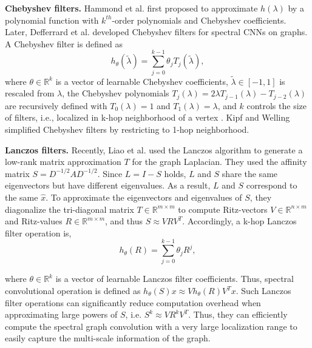 \documentclass{article}
\begin{document}
\smallskip
\textbf{Chebyshev filters.   } Hammond et al. \cite{hammond2011wavelets} first proposed to approximate $h (\lambda)$ by  a polynomial function with $k^{th}$-order polynomials and Chebyshev coefficients. Later, Defferrard et al. \cite{defferrard2016convolutional} developed Chebyshev filters for spectral CNNs on graphs. A Chebyshev filter is defined as
\begin{equation}
h_\theta (\tilde{\lambda})=\sum_{j=0}^{k-1} \theta_j T_j(\tilde{\lambda}),
\end{equation}
where $\theta\in\mathbb{R}^{k}$ is a vector of learnable Chebyshev coefficients, $\tilde{\lambda}\in [-1,1]$ is rescaled from $\lambda$, the Chebyshev polynomials $T_j(\lambda)=2\lambda T_{j-1}(\lambda)-T_{j-2}(\lambda)$ are recursively defined with $T_0(\lambda)=1$ and $T_1(\lambda)=\lambda$, and $k$ controls the size of filters, i.e., localized in k-hop neighborhood of a vertex \cite{hammond2011wavelets}. Kipf and Welling \cite{kipf2016semi} simplified Chebyshev filters by restricting to 1-hop neighborhood.




\smallskip
\textbf{Lanczos filters. } Recently, Liao et al. \cite{liao2019lanczosnet} used the Lanczos algorithm to generate a low-rank matrix approximation $T$ for the graph Laplacian. They used the affinity matrix $S=D^{-1/2}AD^{-1/2}$. Since $L=I-S$ holds, $L$ and $S$ share the same eigenvectors but have different eigenvalues. As a result, $L$ and $S$ correspond to the same $\hat{x}$. To approximate the eigenvectors and eigenvalues of $S$, they diagonalize the tri-diagonal matrix $T \in \mathbb{R}^{m\times m}$ to compute Ritz-vectors $V \in \mathbb{R}^{n\times m}$ and Ritz-values $R \in \mathbb{R}^{m\times m}$, and thus $S \approx VRV^T$. Accordingly, a k-hop Lanczos filter operation is,
\begin{equation}
h_{\theta}(R) = \sum_{j=0}^{k-1}\theta_jR^j,
\end{equation}

where $\theta \in \mathbb{R}^{k}$ is a vector of learnable Lanczos filter coefficients. Thus, spectral convolutional operation is defined as $h_{\theta}(S)x \approx Vh_{\theta}(R)V^Tx$. Such Lanczos filter operations can significantly reduce computation overhead when approximating large powers of $S$, i.e. $S^k \approx VR^kV^T$. Thus, they can efficiently compute the spectral graph convolution with a very large localization range to easily capture the multi-scale information of the graph.
\end{document}
